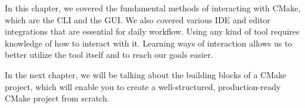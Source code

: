 In this chapter, we covered the fundamental methods of interacting with CMake, which
are the CLI and the GUI. We also covered various IDE and editor integrations that are essential for daily workflow. Using any kind of tool requires knowledge of how to interact with it. Learning ways of interaction allows us to better utilize the tool itself and to reach our goals easier.

In the next chapter, we will be talking about the building blocks of a CMake project, which will enable you to create a well-structured, production-ready CMake project from scratch.
